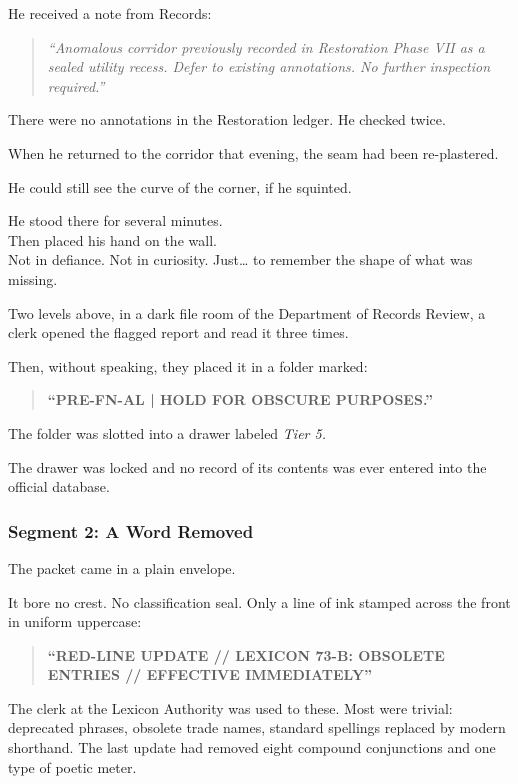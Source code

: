 \documentclass[9pt]{article}
\begin{document}
He received a note from Records:

\begin{quote}
\textit{“Anomalous corridor previously recorded in Restoration Phase VII as a sealed utility recess. Defer to existing annotations. No further inspection required.”}
\end{quote}

There were no annotations in the Restoration ledger. He checked twice.

When he returned to the corridor that evening, the seam had been re-plastered.

He could still see the curve of the corner, if he squinted.

He stood there for several minutes.\\
Then placed his hand on the wall.\\
Not in defiance. Not in curiosity. Just… to remember the shape of what was missing.

\vspace{1em}

Two levels above, in a dark file room of the Department of Records Review, a clerk opened the flagged report and read it three times.

Then, without speaking, they placed it in a folder marked:

\begin{quote}
\textbf{“PRE-FN-AL \quad | \quad HOLD FOR OBSCURE PURPOSES.”}
\end{quote}

The folder was slotted into a drawer labeled \textit{Tier 5.}

The drawer was locked and no record of its contents was ever entered into the official database.


\newpage

\subsubsection*{Segment 2: A Word Removed}

The packet came in a plain envelope.

It bore no crest. No classification seal. Only a line of ink stamped across the front in uniform uppercase:

\begin{quote}
\textbf{“RED-LINE UPDATE // LEXICON 73-B: OBSOLETE ENTRIES // EFFECTIVE IMMEDIATELY”}
\end{quote}

The clerk at the Lexicon Authority was used to these. Most were trivial: deprecated phrases, obsolete trade names, standard spellings replaced by modern shorthand. The last update had removed eight compound conjunctions and one type of poetic meter.
\end{document}
